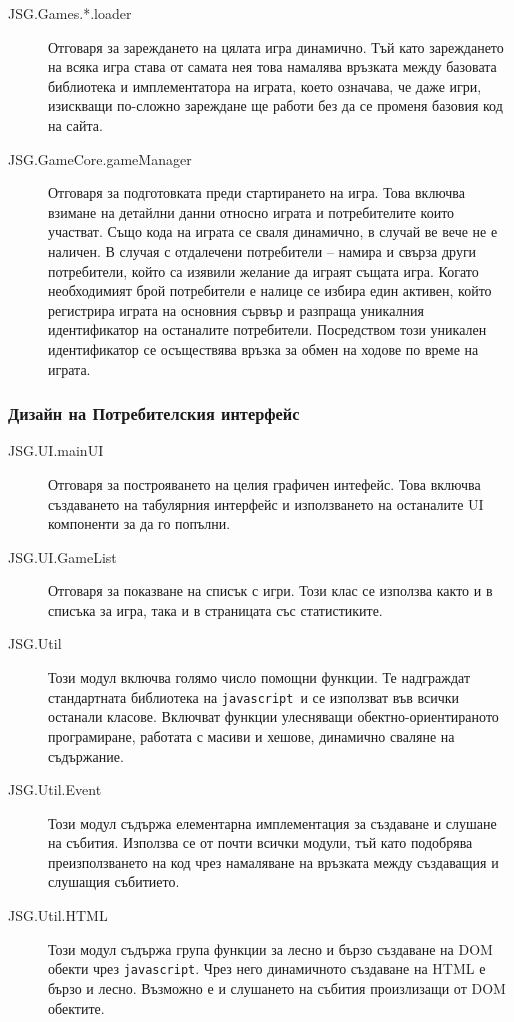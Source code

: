 \documentclass[a4paper]{article}
\def\js{\texttt{javascript}}
\begin{document}
\begin{description}
      \item[JSG.Games.*.loader] Отговаря за зареждането на цялата игра динамично. Тъй като зареждането на всяка игра става от самата нея това намалява връзката между базовата библиотека и имплементатора на играта, което означава, че даже игри, изискващи по-сложно зареждане ще работи без да се променя базовия код на сайта.
      \item[JSG.GameCore.gameManager] Отговаря за подготовката преди стартирането на игра. Това включва взимане на детайлни данни относно играта и потребителите които участват. Също кода на играта се сваля динамично, в случай ве вече не е наличен. В случая с отдалечени потребители -- намира и свърза други потребители, който са изявили желание да играят същата игра. Когато необходимият брой потребители е налице се избира един активен, който регистрира играта на основния сървър и разпраща уникалния идентификатор на останалите потребители. Посредством този уникален идентификатор се осъществява връзка за обмен на ходове по време на играта.
    \end{description}

  \subsubsection{Дизайн на Потребителския интерфейс}
  \begin{description}
    \item[JSG.UI.mainUI] Отговаря за построяването на целия графичен интефейс. Това включва създаването на табулярния интерфейс и използването на останалите UI компоненти за да го попълни.
    \item[JSG.UI.GameList] Отговаря за показване на списък с игри. Този клас се използва както и в списъка за игра, така и в страницата със статистиките.
  \end{description}

  \begin{description}
    \item[JSG.Util] Този модул включва голямо число помощни функции. Те надграждат стандартната библиотека на \js\ и се използват във всички останали класове. Включват функции улесняващи обектно-ориентираното програмиране, работата с масиви и хешове, динамично сваляне на съдържание.
    \item[JSG.Util.Event] Този модул съдържа елементарна имплементация за създаване и слушане на събития. Използва се от почти всички модули, тъй като подобрява преизползването на код чрез намаляване на връзката между създаващия и слушащия събитието.
    \item[JSG.Util.HTML] Този модул съдържа група функции за лесно и бързо създаване на DOM обекти чрез \js. Чрез него динамичното създаване на HTML е бързо и лесно. Възможно е и слушането на събития произлизащи от DOM обектите.
  \end{description}
\end{document}
